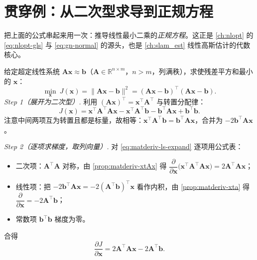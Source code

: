 \section{贯穿例：从二次型求导到正规方程}
\label{sec:matderiv-normal}

把上面的公式串起来用一次：推导线性最小二乘的\emph{正规方程}。这正是 \cref{ch:nlopt} 的 \cref{eq:nlopt-gls} 与 \cref{eq:gn-normal} 的源头，也是 \cref{ch:slam_est} 线性高斯估计的代数核心。

\begin{derivation}[最小二乘正规方程 $\mathbf{A}^\top\mathbf{A}\mathbf{x}=\mathbf{A}^\top\mathbf{b}$]
给定超定线性系统 $\mathbf{A}\mathbf{x}\approx\mathbf{b}$（$\mathbf{A}\in\mathbb{R}^{n\times m}$，$n>m$，列满秩），求使残差平方和最小的 $\mathbf{x}$：
\begin{equation}
  \min_{\mathbf{x}}\ J(\mathbf{x})=\|\mathbf{A}\mathbf{x}-\mathbf{b}\|^2
  =(\mathbf{A}\mathbf{x}-\mathbf{b})^\top(\mathbf{A}\mathbf{x}-\mathbf{b}).
  \label{eq:matderiv-ls-obj}
\end{equation}
\emph{Step 1（展开为二次型）.} 利用 $(\mathbf{A}\mathbf{x})^\top=\mathbf{x}^\top\mathbf{A}^\top$ 与转置分配律：
\begin{equation}
  J(\mathbf{x})
  =\mathbf{x}^\top\mathbf{A}^\top\mathbf{A}\mathbf{x}
  -\mathbf{x}^\top\mathbf{A}^\top\mathbf{b}
  -\mathbf{b}^\top\mathbf{A}\mathbf{x}
  +\mathbf{b}^\top\mathbf{b}.
  \label{eq:matderiv-ls-expand}
\end{equation}
注意中间两项互为转置且都是标量，故相等：$\mathbf{x}^\top\mathbf{A}^\top\mathbf{b}=\mathbf{b}^\top\mathbf{A}\mathbf{x}$，合并为 $-2\mathbf{b}^\top\mathbf{A}\mathbf{x}$。

\emph{Step 2（逐项求梯度，取列向量）.} 对 \cref{eq:matderiv-ls-expand} 逐项用公式表：
\begin{itemize}
  \item 二次项：$\mathbf{A}^\top\mathbf{A}$ 对称，由 \cref{prop:matderiv-xtAx} 得 $\dfrac{\partial}{\partial\mathbf{x}}\big(\mathbf{x}^\top\mathbf{A}^\top\mathbf{A}\mathbf{x}\big)=2\mathbf{A}^\top\mathbf{A}\mathbf{x}$；
  \item 线性项：把 $-2\mathbf{b}^\top\mathbf{A}\mathbf{x}=-2(\mathbf{A}^\top\mathbf{b})^\top\mathbf{x}$ 看作内积，由 \cref{prop:matderiv-xta} 得 $\dfrac{\partial}{\partial\mathbf{x}}=-2\mathbf{A}^\top\mathbf{b}$；
  \item 常数项 $\mathbf{b}^\top\mathbf{b}$ 梯度为零。
\end{itemize}
合得
\begin{equation}
  \frac{\partial J}{\partial\mathbf{x}}=2\mathbf{A}^\top\mathbf{A}\mathbf{x}-2\mathbf{A}^\top\mathbf{b}.
  \label{eq:matderiv-ls-grad}
\end{equation}


\end{derivation}
